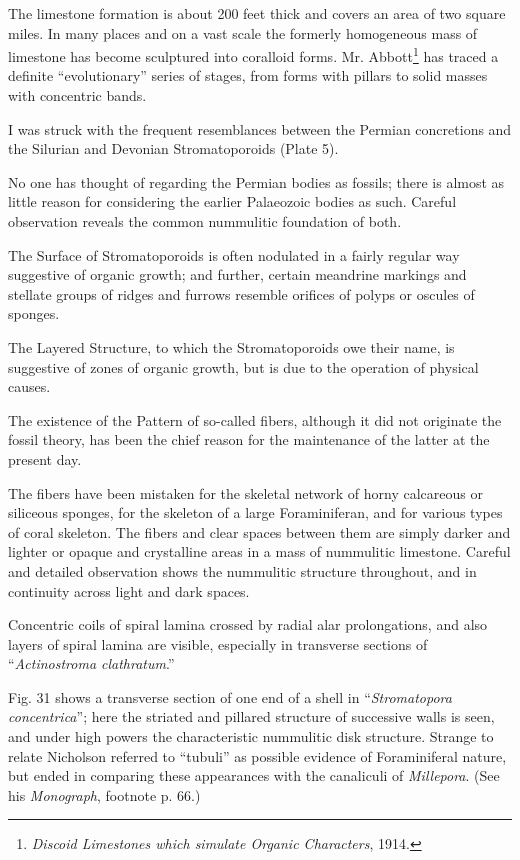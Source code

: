 \documentclass[a4paper, 12pt, oneside]{article}
\begin{document}
The limestone formation is about 200 feet thick and covers an area of two square miles. In many places and on a vast scale the formerly homogeneous mass of limestone has become sculptured into coralloid forms. Mr. Abbott\footnote{\emph{Discoid Limestones which simulate Organic Characters}, 1914.} has traced a definite ``evolutionary'' series of stages, from forms with pillars to solid masses with concentric bands.

I was struck with the frequent resemblances between the Permian concretions and the Silurian and Devonian Stromatoporoids (Plate 5).

No one has thought of regarding the Permian bodies as fossils; there is almost as little reason for considering the earlier Palaeozoic bodies as such. Careful observation reveals the common nummulitic foundation of both.

The Surface of Stromatoporoids is often nodulated in a fairly regular way suggestive of organic growth; and further, certain meandrine markings and stellate groups of ridges and furrows resemble orifices of polyps or oscules of sponges.

The Layered Structure, to which the Stromatoporoids owe their name, is suggestive of zones of organic growth, but is due to the operation of physical causes.

The existence of the Pattern of so-called fibers, although it did not originate the fossil theory, has been the chief reason for the maintenance of the latter at the present day.

The fibers have been mistaken for the skeletal network of horny calcareous or siliceous sponges, for the skeleton of a large Foraminiferan, and for various types of coral skeleton. The fibers and clear spaces between them are simply darker and lighter or opaque and crystalline areas in a mass of nummulitic limestone. Careful and detailed observation shows the nummulitic structure throughout, and in continuity across light and dark spaces.

Concentric coils of spiral lamina crossed by radial alar prolongations, and also layers of spiral lamina are visible, especially in transverse sections of ``\emph{Actinostroma clathratum}.''

Fig. 31 shows a transverse section of one end of a shell in ``\emph{Stromatopora concentrica}''; here the striated and pillared structure of successive walls is seen, and under high powers the characteristic nummulitic disk structure. Strange to relate Nicholson referred to ``tubuli'' as possible evidence of Foraminiferal nature, but ended in comparing these appearances with the canaliculi of \emph{Millepora}. (See his \emph{Monograph}, footnote p. 66.)
\end{document}
